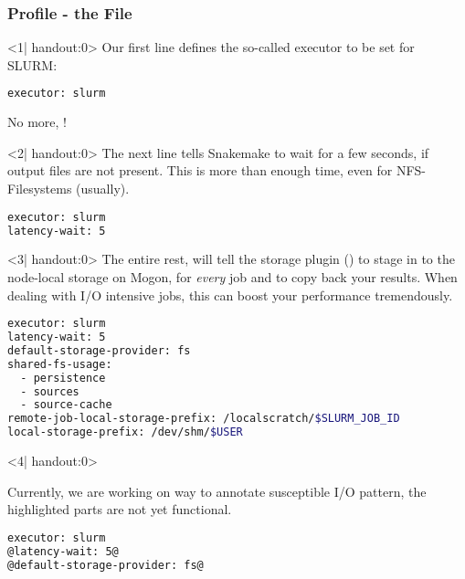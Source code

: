 \begin{frame}[fragile]
  \frametitle{\Snakemake{} Profile - the File}
    \begin{onlyenv}<1| handout:0>
      Our first line defines the so-called executor to be set for SLURM:
      \begin{lstlisting}[language=Bash, style=Shell]
executor: slurm
     \end{lstlisting}
     No more, !
   \end{onlyenv}
   \begin{onlyenv}<2| handout:0>
   	 The next line tells Snakemake to wait for a few seconds, if output files are not present. This is more than enough time, even for NFS-Filesystems (usually). 
   	 \begin{lstlisting}[language=Bash, style=Shell]
executor: slurm
latency-wait: 5
   	 \end{lstlisting}
    \end{onlyenv}
    \begin{onlyenv}<3| handout:0>
      The entire rest, will tell the storage plugin () to stage in to the node-local storage on Mogon, for \emph{every} job and to copy back your results. When dealing with I/O intensive jobs, this can boost your performance tremendously. 
      \begin{lstlisting}[language=Bash, style=Shell]
executor: slurm
latency-wait: 5
default-storage-provider: fs
shared-fs-usage:
  - persistence
  - sources
  - source-cache
remote-job-local-storage-prefix: /localscratch/$SLURM_JOB_ID
local-storage-prefix: /dev/shm/$USER
    \end{lstlisting}
   \end{onlyenv}
  \begin{onlyenv}<4| handout:0>
  	\begin{warning}
  	  Currently, we are working on way to annotate susceptible I/O pattern, the highlighted parts are not yet functional.
  	\end{warning}
  	\begin{lstlisting}[language=Bash, style=Shell]
executor: slurm
@latency-wait: 5@
@default-storage-provider: fs@

\end{lstlisting}
\end{onlyenv}
\end{frame}
